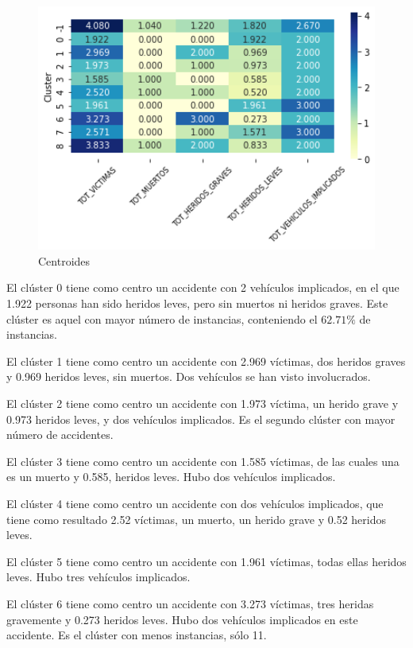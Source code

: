 \documentclass[a4]{article}
\begin{document}
\begin{figure}[H]
  \centering
  \caption{Centroides}
  \includegraphics[width=130mm]{imagenes/c1_dbscan_centroides}
\end{figure}

El clúster 0 tiene como centro un accidente con 2 vehículos implicados, en el que 1.922 personas han sido heridos leves, pero sin muertos ni heridos graves. Este clúster es aquel con mayor número de instancias, conteniendo el $62.71\%$ de instancias.

El clúster 1 tiene como centro un accidente con 2.969 víctimas, dos heridos graves y 0.969 heridos leves, sin muertos. Dos vehículos se han visto involucrados.

El clúster 2 tiene como centro un accidente con 1.973 víctima, un herido grave y 0.973 heridos leves, y dos vehículos implicados. Es el segundo clúster con mayor número de accidentes.

El clúster 3 tiene como centro un accidente con 1.585 víctimas, de las cuales una es un muerto y 0.585, heridos leves. Hubo dos vehículos implicados.

El clúster 4 tiene como centro un accidente con dos vehículos implicados, que tiene como resultado 2.52 víctimas, un muerto, un herido grave y 0.52 heridos leves.

El clúster 5 tiene como centro un accidente con 1.961 víctimas, todas ellas heridos leves. Hubo tres vehículos implicados.

El clúster 6 tiene como centro un accidente con 3.273 víctimas, tres heridas gravemente y 0.273 heridos leves. Hubo dos vehículos implicados en este accidente. Es el clúster con menos instancias, sólo 11.
\end{document}
